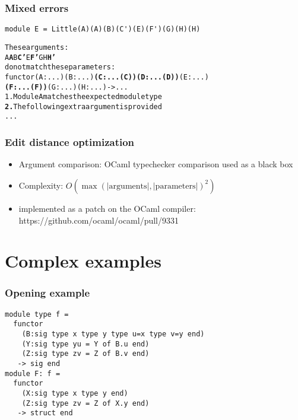 \documentclass[a4paper,11pt]{beamer}
\begin{document}
\begin{frame}[fragile]\frametitle{Mixed errors}
\begin{verbatim}
module E = Little(A)(A)(B)(C')(E)(F')(G)(H)(H)
\end{verbatim}
\begin{alltt}
These arguments:
  {\color{green}{}A} {\color{red}{}\bfseries{}A} {\color{green}{}B} {\color{magenta}{}\bfseries{}C'} {\color{red}{}\bfseries{}} {\color{green}{}E} {\color{magenta}{}\bfseries{}F'} {\color{green}{}G} {\color{green}{}H} {\color{red}{}\bfseries{}H'}
do not match these parameters:
  functor {\color{green}{}(A : ...)} {\color{red}{}\bfseries{}} {\color{green}{}(B : ...)} {\color{magenta}{}\bfseries{}(C : ...(C))} {\color{red}{}\bfseries{}(D : ...(D))} {\color{green}{}(E : ...)}
  {\color{magenta}{}\bfseries{}(F : ...(F))} {\color{green}{}(G : ...)} {\color{green}{}(H : ...)} {\color{red}{}\bfseries{}} -> ...
{\color{green}{}1.} Module A matches the expected module type
{\color{red}{}\bfseries{}2.} The following extra argument is provided
  ...
\end{alltt}
\end{frame}


\begin{frame}\frametitle{Edit distance optimization}
  \begin{itemize}
    \item{Argument comparison: OCaml typechecker comparison used as a black box}
    \item{Complexity: $O(\max(\mathrm{|arguments|,|parameters|})^2)$}
    \item{implemented as a patch on the OCaml compiler:
      https://github.com/ocaml/ocaml/pull/9331 }
  \end{itemize}
\end{frame}


\section{Complex examples}

\begin{frame}
\end{frame}

\begin{frame}[fragile]\frametitle{Opening example}
\begin{verbatim}
module type f =
  functor
    (B:sig type x type y type u=x type v=y end)
    (Y:sig type yu = Y of B.u end)
    (Z:sig type zv = Z of B.v end)
   -> sig end
module F: f =
  functor
    (X:sig type x type y end)
    (Z:sig type zv = Z of X.y end)
   -> struct end
\end{verbatim}
\end{frame}
\end{document}

